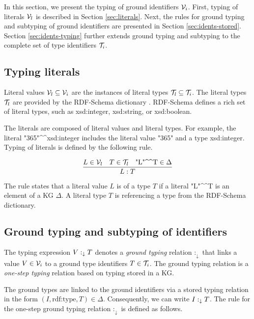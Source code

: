 \documentclass[runningheads]{llncs}
\newcommand{\darr}{\downarrow}
\newcommand{\V}{{\cal V}}
\newcommand{\T}{{\cal T}}
\begin{document}
In this section, we present the typing of ground identifiers
$\V_i$. First, typing of literals $\V_l$ is described in Section
\ref{sec:literals}. Next, the rules for ground typing and subtyping of
ground identifiers are presented in Section
\ref{sec:idents-stored}. Section \ref{sec:idents-typing} further
extends ground typing and subtyping to the complete set of type
identifiers $\T_i$.





\subsection{Typing literals\label{sec:literals}}

Literal values $\V_l\subseteq\V_i$ are the instances of literal types
$\T_l\subseteq\T_i$. The literal types $\T_l$ are provided by the
RDF-Schema dictionary \cite{rdfschema}. RDF-Schema defines a rich set
of literal types, such as xsd:integer, xsd:string, or xsd:boolean.

The literals are composed of literal values and literal types. For
example, the literal
"365"\textasciicircum\textasciicircum\/xsd:integer includes the
literal value "365" and a type xsd:integer. Typing of literals is
defined by the following rule.

\begin{equation}
\dfrac{L\in\V_l\quad T\in\T_l\quad \text{"L"\textasciicircum\textasciicircum\/T}\in\Delta}
      {L:T}  
\end{equation}

The rule states that a literal value $L$ is of a type $T$ if a literal
"L"\textasciicircum\textasciicircum\/T is an element of a KG
$\Delta$. A literal type $T$ is referencing a type from the RDF-Schema
dictionary.






\subsection{Ground typing and subtyping of identifiers\label{sec:idents-stored}}

The typing expression $V:_\darr\/T$ denotes a \emph{ground typing}
relation $:_\darr$ that links a value $V\in\V_i$ to a ground type
identifiers $T\in\T_i$. The ground typing relation is a \emph{one-step
  typing} relation based on typing stored in a KG.

The ground types are linked to the ground identifiers via a stored
typing relation in the form
$(I,\text{rdf:type},T)\in\Delta$. Consequently, we can write
$I:_\darr\/T$. The rule for the one-step ground typing relation
$:_\darr$ is defined as follows.
\end{document}
